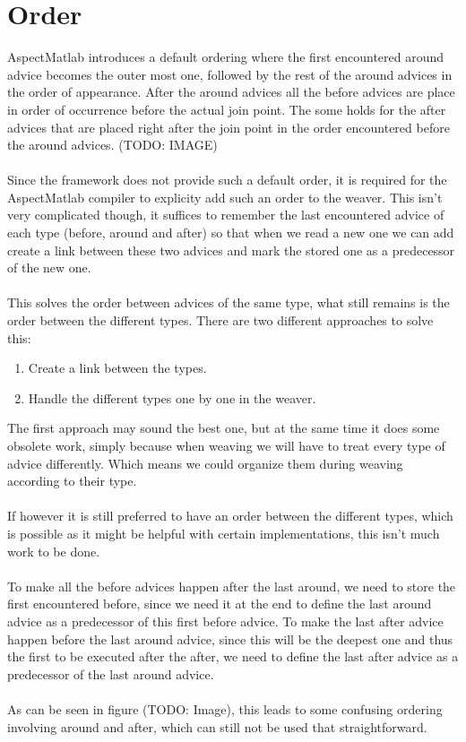 \documentclass[a4paper]{report}
\begin{document}
\section{Order}
AspectMatlab introduces a default ordering where the first encountered around advice becomes the outer most one, followed by the rest of the around advices in the order of appearance. After the around advices all the before advices are place in order of occurrence before the actual join point. The some holds for the after advices that are placed right after the join point in the order encountered before the around advices. (TODO: IMAGE)\\
\\
Since the framework does not provide such a default order, it is required for the AspectMatlab compiler to explicity add such an order to the weaver. This isn't very complicated though, it suffices to remember the last encountered advice of each type (before, around and after) so that when we read a new one we can add create a link between these two advices and mark the stored one as a predecessor of the new one.\\
\\
This solves the order between advices of the same type, what still remains is the order between the different types. There are two different approaches to solve this:
\begin{enumerate}
\item Create a link between the types.
\item Handle the different types one by one in the weaver.
\end{enumerate}
The first approach may sound the best one, but at the same time it does some obsolete work, simply because when weaving we will have to treat every type of advice differently. Which means we could organize them during weaving according to their type.\\
\\
If however it is still preferred to have an order between the different types, which is possible as it might be helpful with certain implementations, this isn't much work to be done.\\
\\
To make all the before advices happen after the last around, we need to store the first encountered before, since we need it at the end to define the last around advice as a predecessor of this first before advice. To make the last after advice happen before the last around advice, since this will be the deepest one and thus the first to be executed after the after, we need to define the last after advice as a predecessor of the last around advice. \\
\\
As can be seen in figure (TODO: Image), this leads to some confusing ordering involving around and after, which can still not be used that straightforward.
\end{document}
